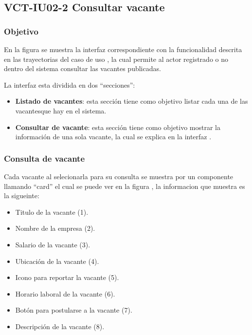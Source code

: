 \clearpage
\subsection{VCT-IU02-2 Consultar vacante}

\subsubsection{Objetivo}
En la figura  se muestra la interfaz correspondiente con la funcionalidad descrita en las
trayectorias del caso de uso  , la cual permite al actor registrado o no dentro del sistema consultar 
las vacantes publicadas.

La interfaz esta dividida en dos ``secciones'':
\begin{itemize}
   \item \textbf{Listado de vacantes}: esta sección tiene como objetivo listar cada una de las vacantesque hay en el sistema.
   \item \textbf{Consultar de vacante}: esta sección tiene como objetivo mostrar la información de una sola vacante, la cual se explica en 
   la interfaz .
\end{itemize}


\subsubsection{Consulta de vacante}
Cada vacante al selecionarla para su consulta se muestra por un componente llamando ``card'' el cual se puede ver en la figura , la informacion que 
muestra es la sigueinte: 
\begin{itemize}
   \item Titulo de la vacante (1).
   \item Nombre de la empresa (2).
   \item Salario de la vacante (3).
   \item Ubicación de la vacante (4).
   \item Icono para reportar la vacante (5).
   \item Horario laboral de la vacante (6).
   \item Botón para postularse a la vacante (7).
   \item Descripción de la vacante (8).
\end{itemize}




\clearpage
